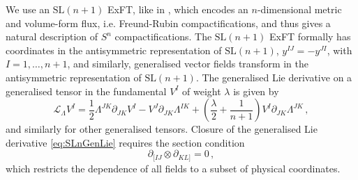 \documentclass[a4paper, 11pt]{article}
\numberwithin{equation}{section}
\newcommand{\SL}[1]{\mathrm{SL}( #1 )}
\newcommand{\+}{\oplus}
\newcommand{\gL}{\mathcal{L}}
\begin{document}
We use an $\SL{n+1}$ ExFT, like in \cite{Lee:2014mla}, which encodes an $n$-dimensional metric and volume-form flux, i.e. Freund-Rubin compactifications, and thus gives a natural description of $S^n$ compactifications. The $\SL{n+1}$ ExFT formally has coordinates in the antisymmetric representation of $\SL{n+1}$, $y^{IJ} = - y^{JI}$, with $I = 1, \ldots, n+1$, and similarly, generalised vector fields transform in the antisymmetric representation of $\SL{n+1}$. The generalised Lie derivative on a generalised tensor in the fundamental $V^I$ of weight $\lambda$ is given by
\begin{equation} \label{eq:SLnGenLie}
	\gL_\Lambda V^I = \frac12 \Lambda^{JK} \partial_{JK} V^{I} - V^J \partial_{JK} \Lambda^{IK} + \left( \frac{\lambda}{2} + \frac{1}{n+1} \right) V^I \partial_{JK} \Lambda^{JK} \,,
\end{equation}
and similarly for other generalised tensors. Closure of the generalised Lie derivative \eqref{eq:SLnGenLie} requires the section condition
\begin{equation} \label{eq:SLnSC}
	\partial_{[IJ} \otimes \partial_{KL]} = 0 \,,
\end{equation}
which restricts the dependence of all fields to a subset of physical coordinates.
\end{document}
